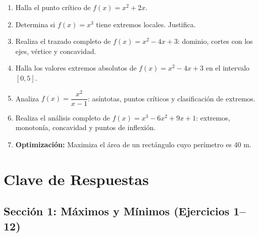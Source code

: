\documentclass[12pt, letterpaper]{article}
\begin{document}
\begin{enumerate}[resume=ejercicios, leftmargin=*]
  \item \facil{} Halla el punto crítico de $f(x) = x^2 + 2x$.

  \item \medio{} Determina si $f(x) = x^3$ tiene extremos locales. Justifica.

  \item \medio{} Realiza el trazado completo de $f(x) = x^2 - 4x + 3$: dominio, cortes con los ejes, vértice y concavidad.

  \item \dificil{} Halla los valores extremos absolutos de $f(x) = x^2 - 4x + 3$ en el intervalo $[0, 5]$.

  \item \dificil{} Analiza $f(x) = \dfrac{x^2}{x - 1}$: asíntotas, puntos críticos y clasificación de extremos.

  \item \muyDificil{} Realiza el análisis completo de $f(x) = x^3 - 6x^2 + 9x + 1$: extremos, monotonía, concavidad y puntos de inflexión.

  \item \muyDificil{} \textbf{Optimización:} Maximiza el área de un rectángulo cuyo perímetro es 40 m.
\end{enumerate}
\newpage
\ifmwclaves
  \section{Clave de Respuestas}

  \subsection*{Sección 1: Máximos y Mínimos (Ejercicios 1--12)}
\end{document}
